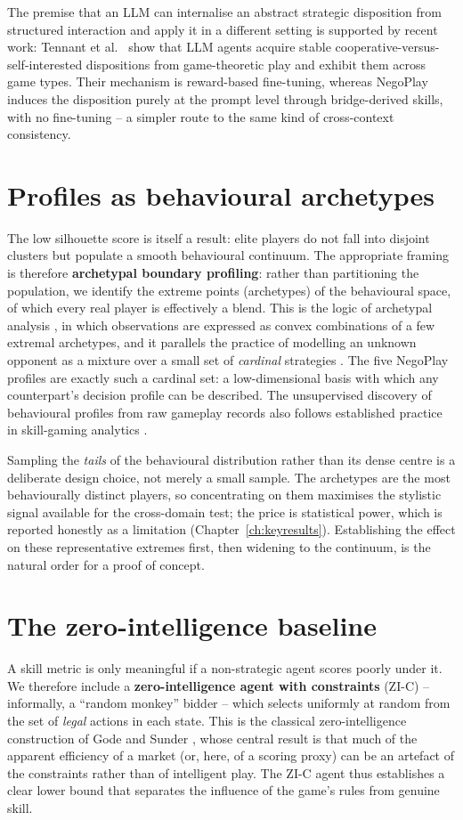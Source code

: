 \documentclass[11pt, a4paper, oneside, openany]{report}
\begin{document}
The premise that an LLM can internalise an abstract strategic disposition from
structured interaction and apply it in a different setting is supported by
recent work: Tennant et al.\ \cite{tennant2025} show that LLM agents
acquire stable cooperative-versus-self-interested dispositions from
game-theoretic play and exhibit them across game types. Their mechanism is
reward-based fine-tuning, whereas NegoPlay induces the disposition purely at
the prompt level through bridge-derived skills, with no fine-tuning -- a
simpler route to the same kind of cross-context consistency.

\section{Profiles as behavioural archetypes}
The low silhouette score is itself a result: elite players do not fall into
disjoint clusters but populate a smooth behavioural continuum.
The appropriate framing is therefore \textbf{archetypal boundary profiling}:
rather than partitioning the population, we identify the extreme points
(archetypes) of the behavioural space, of which every real player is
effectively a blend. This is the logic of archetypal analysis
\cite{cutler1994}, in which observations are expressed as convex combinations
of a few extremal archetypes, and it parallels the practice of modelling an
unknown opponent as a mixture over a small set of \emph{cardinal} strategies
\cite{lockett2007}. The five NegoPlay profiles are exactly such a cardinal set:
a low-dimensional basis with which any counterpart's decision profile can be
described. The unsupervised discovery of behavioural profiles from raw gameplay
records also follows established practice in skill-gaming analytics
\cite{talwadker2022}.

Sampling the \emph{tails} of the behavioural distribution rather than its
dense centre is a deliberate design choice, not merely a small sample. The
archetypes are the most behaviourally distinct players, so concentrating on
them maximises the stylistic signal available for the cross-domain test; the
price is statistical power, which is reported honestly as a limitation
(Chapter~\ref{ch:keyresults}). Establishing the effect on these representative
extremes first, then widening to the continuum, is the natural order for a
proof of concept.

\section{The zero-intelligence baseline}
A skill metric is only meaningful if a non-strategic agent scores poorly under
it. We therefore include a \textbf{zero-intelligence agent with constraints}
(ZI-C) -- informally, a ``random monkey'' bidder -- which selects uniformly at
random from the set of \emph{legal} actions in each state. This is the
classical zero-intelligence construction of Gode and Sunder
\cite{godesunder1993}, whose central result is that much of the apparent
efficiency of a market (or, here, of a scoring proxy) can be an artefact of the
constraints rather than of intelligent play. The ZI-C agent thus establishes a
clear lower bound that separates the influence of the game's rules from
genuine skill.
\end{document}
